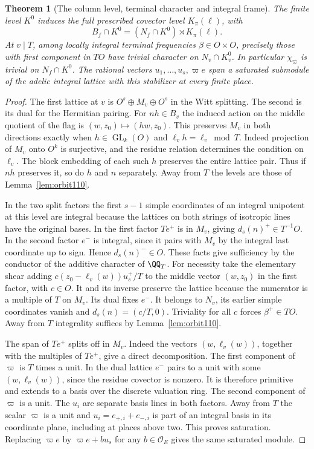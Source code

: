 \documentclass[a4paper,11pt]{article}
\newtheorem{theorem}[proposition]{Theorem}
\theoremstyle{definition}
\theoremstyle{remark}
\numberwithin{equation}{section}
\newcommand{\GL}{\operatorname{GL}}
\newcommand{\OO}{\mathcal O}
\begin{document}
\begin{theorem}[The column level, terminal character and integral frame]
\label{thm:midlevel131}
The finite level \(K^0\) induces the full prescribed covector
level \(K_\pi(\ell)\), with
\[
       B_f\cap K^0=(N_f\cap K^0)\rtimes K_\pi(\ell).
\]
At \(v\mid T\), among locally integral terminal frequencies
\(\beta\in O\times O\), precisely those with first component
in \(TO\) have trivial character on \(N_v\cap K_v^0\).
In particular \(\chi_\varpi\) is trivial on \(N_f\cap K^0\).
The rational vectors \(u_1,\ldots,u_s,\varpi e\) span a
saturated submodule of the adelic integral lattice with this
stabilizer at every finite place.
\end{theorem}
\begin{proof}
The first lattice at \(v\) is \(O^s\oplus M_v\oplus O^s\) in
the Witt splitting. The second is its dual for the Hermitian
pairing. For \(nh\in B_v\) the induced action on the middle
quotient of the flag is \((w,z_0)\mapsto(hw,z_0)\). This
preserves \(M_v\) in both directions exactly when
\(h\in\GL_k(O)\) and \(\ell_v h=\ell_v\bmod T\). Indeed
projection of \(M_v\) onto \(O^k\) is surjective, and the
residue relation determines the condition on \(\ell_v\).
The block embedding of each such \(h\) preserves the entire
lattice pair. Thus if \(nh\) preserves it, so do \(h\) and
\(n\) separately. Away from \(T\) the levels are those of
Lemma~\ref{lem:orbit110}.

In the two split factors the first \(s-1\) simple coordinates
of an integral unipotent at this level are integral because
the lattices on both strings of isotropic lines have the original
bases. In the first factor \(Te^+\) is in \(M_v\), giving
\(d_s(n)^+\in T^{-1}O\). In the second factor \(e^-\) is
integral, since it pairs with \(M_v\) by the integral last
coordinate up to sign. Hence \(d_s(n)^-\in O\). These facts
give sufficiency by the conductor of the additive character of
\(\QQ_T\). For necessity take the elementary shear adding
\(c(z_0-\ell_v(w))u_s^+/T\) to the middle vector \((w,z_0)\)
in the first factor, with \(c\in O\). It and its inverse preserve
the lattice because the numerator is a multiple of \(T\) on
\(M_v\). Its dual fixes \(e^-\). It belongs to \(N_v\), its
earlier simple coordinates vanish and \(d_s(n)=(c/T,0)\).
Triviality for all \(c\) forces \(\beta^+\in TO\). Away from
\(T\) integrality suffices by Lemma~\ref{lem:orbit110}.

The span of \(Te^+\) splits off in \(M_v\). Indeed the vectors
\((w,\ell_v(w))\), together with the multiples of \(Te^+\),
give a direct decomposition. The first component of \(\varpi\)
is \(T\) times a unit. In the dual lattice \(e^-\) pairs to a
unit with some \((w,\ell_v(w))\), since the residue covector is
nonzero. It is therefore primitive and extends to a basis over
the discrete valuation ring. The second component of \(\varpi\)
is a unit. The \(u_i\) are separate basis lines in both factors.
Away from \(T\) the scalar \(\varpi\) is a unit and
\(u_i=e_{+,i}+e_{-,i}\) is part of an integral basis in its
coordinate plane, including at places above two. This proves
saturation. Replacing \(\varpi e\) by \(\varpi e+b u_s\) for
any \(b\in\OO_E\) gives the same saturated module.
\end{proof}
\end{document}
